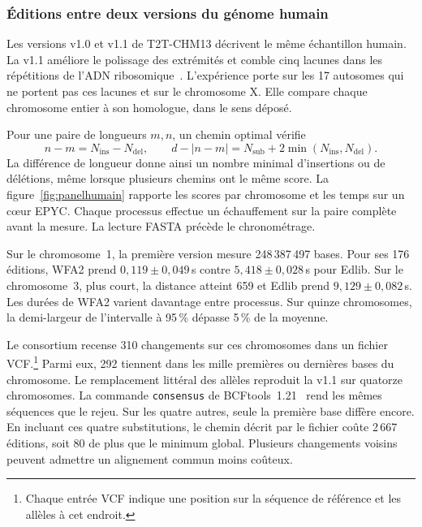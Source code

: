\subsubsection{Éditions entre deux versions du génome humain}\label{sec:panelhumain}
Les versions v1.0 et v1.1 de T2T-CHM13 décrivent le même échantillon humain. La v1.1 améliore le polissage des extrémités et comble cinq lacunes dans les répétitions de l'ADN ribosomique~\cite{chmreleases,mccartney}. L'expérience porte sur les 17 autosomes qui ne portent pas ces lacunes et sur le chromosome X. Elle compare chaque chromosome entier à son homologue, dans le sens déposé.

Pour une paire de longueurs \(m,n\), un chemin optimal vérifie
\[
 n-m=N_{\mathrm{ins}}-N_{\mathrm{del}},\qquad
 d-|n-m|=N_{\mathrm{sub}}+2\min(N_{\mathrm{ins}},N_{\mathrm{del}}).
\]
La différence de longueur donne ainsi un nombre minimal d'insertions ou de délétions, même lorsque plusieurs chemins ont le même score. La figure~\ref{fig:panelhumain} rapporte les scores par chromosome et les temps sur un cœur EPYC. Chaque processus effectue un échauffement sur la paire complète avant la mesure. La lecture FASTA précède le chronométrage.

Sur le chromosome~1, la première version mesure 248\,387\,497 bases. Pour ses 176 éditions, WFA2 prend \(0{,}119\pm0{,}049\)\,s contre \(5{,}418\pm0{,}028\)\,s pour Edlib. Sur le chromosome~3, plus court, la distance atteint 659 et Edlib prend \(9{,}129\pm0{,}082\)\,s. Les durées de WFA2 varient davantage entre processus. Sur quinze chromosomes, la demi-largeur de l'intervalle à 95\,\% dépasse 5\,\% de la moyenne.

Le consortium recense 310 changements sur ces chromosomes dans un fichier VCF.\footnote{Chaque entrée VCF indique une position sur la séquence de référence et les allèles à cet endroit.} Parmi eux, 292 tiennent dans les mille premières ou dernières bases du chromosome. Le remplacement littéral des allèles reproduit la v1.1 sur quatorze chromosomes. La commande \texttt{consensus} de BCFtools~1.21~\cite{bcftools} rend les mêmes séquences que le rejeu. Sur les quatre autres, seule la première base diffère encore. En incluant ces quatre substitutions, le chemin décrit par le fichier coûte 2\,667 éditions, soit 80 de plus que le minimum global. Plusieurs changements voisins peuvent admettre un alignement commun moins coûteux.

